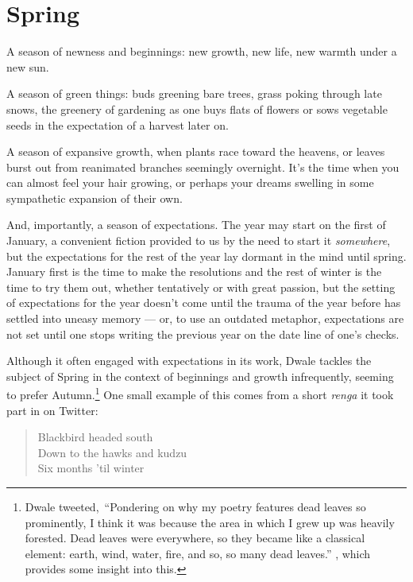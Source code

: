 \section*{Spring}

A season of newness and beginnings: new growth, new life, new warmth under a new sun.

A season of green things: buds greening bare trees, grass poking through late snows, the greenery of gardening as one buys flats of flowers or sows vegetable seeds in the expectation of a harvest later on.

A season of expansive growth, when plants race toward the heavens, or leaves burst out from reanimated branches seemingly overnight. It's the time when you can almost feel your hair growing, or perhaps your dreams swelling in some sympathetic expansion of their own.

And, importantly, a season of expectations. The year may start on the first of January, a convenient fiction provided to us by the need to start it \emph{somewhere}, but the expectations for the rest of the year lay dormant in the mind until spring. January first is the time to make the resolutions and the rest of winter is the time to try them out, whether tentatively or with great passion, but the setting of expectations for the year doesn't come until the trauma of the year before has settled into uneasy memory --- or, to use an outdated metaphor, expectations are not set until one stops writing the previous year on the date line of one's checks.

Although it often engaged with expectations in its work, Dwale tackles the subject of Spring in the context of beginnings and growth infrequently, seeming to prefer Autumn.\footnote{Dwale tweeted,\footnotemark~``Pondering on why my poetry features dead leaves so prominently, I think it was because the area in which I grew up was heavily forested. Dead leaves were everywhere, so they became like a classical element: earth, wind, water, fire, and so, so many dead leaves.'' \parencite{dwale_leaves_tweet}, which provides some insight into this.} One small example of this comes from a short \emph{renga} it took part in on Twitter:

\begin{verse}
Blackbird headed south\\
Down to the hawks and kudzu\\
Six months 'til winter

\parencite{dwale_haiku}
\end{verse}

